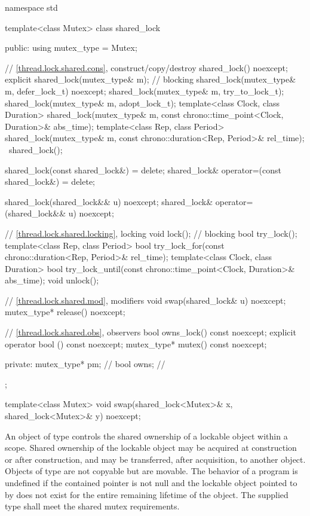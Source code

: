 %
\begin{codeblock}
namespace std {
  template<class Mutex>
  class shared_lock {
  public:
    using mutex_type = Mutex;

    // \ref{thread.lock.shared.cons}, construct/copy/destroy
    shared_lock() noexcept;
    explicit shared_lock(mutex_type& m);        // blocking
    shared_lock(mutex_type& m, defer_lock_t) noexcept;
    shared_lock(mutex_type& m, try_to_lock_t);
    shared_lock(mutex_type& m, adopt_lock_t);
    template<class Clock, class Duration>
      shared_lock(mutex_type& m, const chrono::time_point<Clock, Duration>& abs_time);
    template<class Rep, class Period>
      shared_lock(mutex_type& m, const chrono::duration<Rep, Period>& rel_time);
    ~shared_lock();

    shared_lock(const shared_lock&) = delete;
    shared_lock& operator=(const shared_lock&) = delete;

    shared_lock(shared_lock&& u) noexcept;
    shared_lock& operator=(shared_lock&& u) noexcept;

    // \ref{thread.lock.shared.locking}, locking
    void lock();                                // blocking
    bool try_lock();
    template<class Rep, class Period>
      bool try_lock_for(const chrono::duration<Rep, Period>& rel_time);
    template<class Clock, class Duration>
      bool try_lock_until(const chrono::time_point<Clock, Duration>& abs_time);
    void unlock();

    // \ref{thread.lock.shared.mod}, modifiers
    void swap(shared_lock& u) noexcept;
    mutex_type* release() noexcept;

    // \ref{thread.lock.shared.obs}, observers
    bool owns_lock() const noexcept;
    explicit operator bool () const noexcept;
    mutex_type* mutex() const noexcept;

  private:
    mutex_type* pm;                             // \expos
    bool owns;                                  // \expos
  };

  template<class Mutex>
    void swap(shared_lock<Mutex>& x, shared_lock<Mutex>& y) noexcept;
}
\end{codeblock}

\pnum
An object of type  controls the shared ownership of a
lockable object within a scope. Shared ownership of the lockable object may be
acquired at construction or after construction, and may be transferred, after
acquisition, to another  object. Objects of type
 are not copyable but are movable. The behavior of a program
is undefined if the contained pointer  is not null and the lockable
object pointed to by  does not exist for the entire remaining
lifetime of the  object. The supplied
 type shall meet the shared mutex
requirements.

